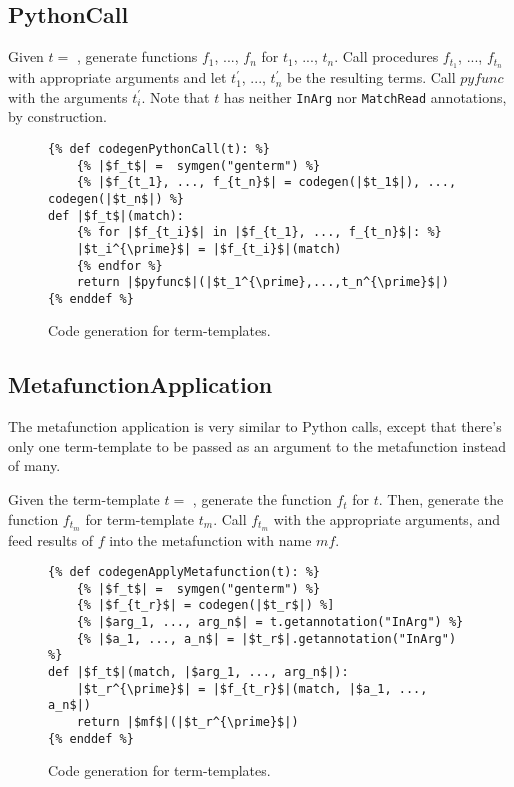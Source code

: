 \subsection{PythonCall}
Given $t=$ \space \PythonCall \space, generate functions $f_1$, ..., $f_n$ for $t_1$, ..., $t_n$. Call procedures $f_{t_1}$, ..., $f_{t_n}$ with appropriate arguments and let $t_1^{\prime}$, ..., $t_n^{\prime}$ be the resulting terms. Call $pyfunc$ with the arguments $t_i^{\prime}$. Note that $t$ has neither \texttt{InArg} nor \texttt{MatchRead} annotations, by construction.

\begin{figure}[htb]
\begin{verbatim}
{% def codegenPythonCall(t): %}
	{% |$f_t$| =  symgen("genterm") %}
	{% |$f_{t_1}, ..., f_{t_n}$| = codegen(|$t_1$|), ..., codegen(|$t_n$|) %}
def |$f_t$|(match):
	{% for |$f_{t_i}$| in |$f_{t_1}, ..., f_{t_n}$|: %}
	|$t_i^{\prime}$| = |$f_{t_i}$|(match)
	{% endfor %}
	return |$pyfunc$|(|$t_1^{\prime},...,t_n^{\prime}$|)
{% enddef %}
\end{verbatim}
\caption{Code generation for \PythonCallNoArg \space term-templates.}
\label{codegen-term-pycall}
\end{figure}


\subsection{MetafunctionApplication}
The metafunction application is very similar to Python calls, except that there's only one term-template to be passed as an argument to the metafunction instead of many.

Given the term-template $t=$ \ApplyMetafunction, generate the function $f_t$ for $t$. Then, generate the function $f_{t_m}$ for term-template $t_m$. Call $f_{t_m}$ with the appropriate arguments, and feed results of $f$ into the metafunction with name $mf$.

\begin{figure}[htb]
\begin{verbatim}
{% def codegenApplyMetafunction(t): %}
	{% |$f_t$| =  symgen("genterm") %}
	{% |$f_{t_r}$| = codegen(|$t_r$|) %]
	{% |$arg_1, ..., arg_n$| = t.getannotation("InArg") %}
	{% |$a_1, ..., a_n$| = |$t_r$|.getannotation("InArg") %}
def |$f_t$|(match, |$arg_1, ..., arg_n$|):
	|$t_r^{\prime}$| = |$f_{t_r}$|(match, |$a_1, ..., a_n$|)
	return |$mf$|(|$t_r^{\prime}$|)
{% enddef %}
\end{verbatim}
\caption{Code generation for \MetafunctionApplicationNoArgs \space term-templates.}
\label{codegen-term-mfapply}
\end{figure}
